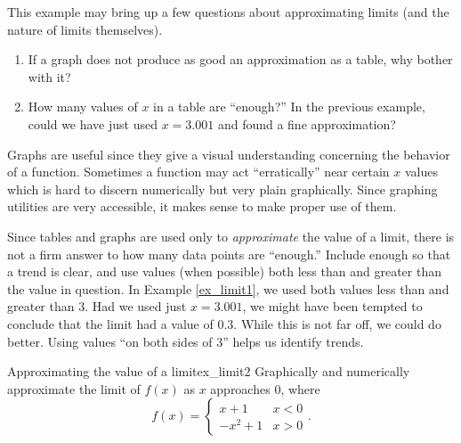 This example may bring up a few questions about approximating limits (and the nature of limits themselves). 
\begin{enumerate}
\item		If a graph does not produce as good an approximation as a table, why bother with it?
\item		How many values of $x$ in a table are ``enough?'' In the previous example, could we have just used $x=3.001$ and found a fine approximation?
\end{enumerate}

Graphs are useful since they give a visual understanding concerning the behavior of a function. Sometimes a function may act ``erratically'' near certain $x$ values which is hard to discern numerically but very plain graphically. Since graphing utilities are very accessible, it makes sense to make proper use of them.


Since tables and graphs are used only to \textit{approximate} the value of a limit, there is not a firm answer to how many data points are ``enough.'' Include enough so that a trend is clear, and use values (when possible) both less than and greater than the value in question. In Example \ref{ex_limit1}, we used both values less than and greater than 3. Had we used just $x=3.001$, we might have been tempted to conclude that the limit had a value of $0.3$. While this is not far off, we could do better. Using values ``on both sides of 3'' helps us identify trends.\\

\begin{example}{Approximating the value of a limit}{ex_limit2}{
Graphically and numerically approximate the limit of $f(x)$ as $x$ approaches 0, where $$f(x) = \left\{\begin{array}{rl} x+1 & x< 0 \\ -x^2+1 & x > 0 \end{array}\right..$$}
\end{example}


